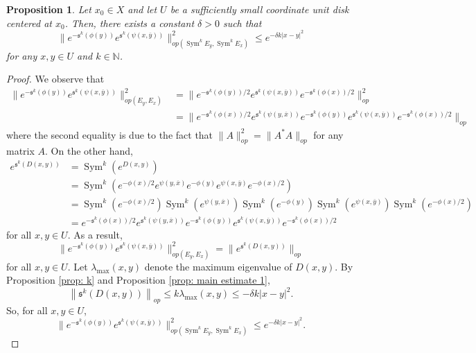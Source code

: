 \documentclass{amsart}
\newtheorem{prop}[thm]{Proposition}
\theoremstyle{definition}
\theoremstyle{remark}
\numberwithin{equation}{section}
\DeclareMathOperator{\Sym}{Sym}
\begin{document}
\begin{prop} \label{prop: main estimate 2}
Let $x_0 \in X$ and let $U$ be a sufficiently small coordinate unit disk centered at $x_0$. Then, there exists a constant $\delta > 0$ such that
$$
\|e^{-\mathfrak{s}^k( \phi(y))}e^{\mathfrak{s}^k(\psi(x,\overline{y}))}\|_{op(\Sym^kE_y,\Sym^kE_x)}^2 \leq e^{-\delta k|x-y|^2}
$$
for any $x,y \in U$ and $k \in \mathbb{N}$. 
\end{prop}
\begin{proof}

We observe that
\begin{align*}
\|e^{-\mathfrak{s}^k(\phi(y))}e^{\mathfrak{s}^k(\psi(x,\overline{y}))}\|_{op(E_y,E_x)}^2 & = \| e^{-\mathfrak{s}^k(\phi(y))/2} e^{\mathfrak{s}^k(\psi(x,\overline{y}))} e^{-\mathfrak{s}^k(\phi(x))/2}\|_{op}^2 \\
    & = \|e^{-\mathfrak{s}^k(\phi(x))/2} e^{\mathfrak{s}^k(\psi(y,\overline{x}))}e^{ - \mathfrak{s}^k(\phi(y))}  e^{\mathfrak{s}^k(\psi(x,\overline{y}))} e^{-\mathfrak{s}^k(\phi(x))/2}\|_{op} 
\end{align*}
where the second equality is due to the fact that $\|A\|_{op}^2 = \|A^*A\|_{op}$ for any matrix $A$. On the other hand,
\begin{equation*}
\begin{split}
e^{\mathfrak{s}^k \left ( D(x,y) \right )}
& = \Sym^k \left ( e^{D(x,y)} \right ) \\
& = \Sym^k \left ( e^{-\phi(x)/2} e^{\psi(y,\overline{x})}e^{-\phi(y)}  e^{\psi(x,\overline{y})} e^{-\phi(x)/2}\right )  \\
& = \Sym^k \left ( e^{-\phi(x)/2} \right ) \Sym^k \left ( e^{\psi(y,\overline{x})} \right ) \Sym^k \left ( e^{-\phi(y)} \right ) \Sym^k \left (  e^{\psi(x,\overline{y})} \right ) \Sym^k \left ( e^{-\phi(x)/2} \right )\\
& = e^{-\mathfrak{s}^k(\phi(x))/2} e^{\mathfrak{s}^k(\psi(y,\overline{x}))}e^{ - \mathfrak{s}^k(\phi(y))}  e^{\mathfrak{s}^k(\psi(x,\overline{y}))} e^{-\mathfrak{s}^k(\phi(x))/2}
\end{split}
\end{equation*}
for all $x,y \in U$.
As a result,
\begin{equation*}
\|e^{-\mathfrak{s}^k(\phi(y))}e^{\mathfrak{s}^k(\psi(x,\overline{y}))}\|_{op(E_y,E_x)}^2 = \|e^{\mathfrak{s}^k (D(x,y))}\|_{op}
\end{equation*}
for all $x,y \in U$. Let $\lambda_{\max}(x,y)$ denote the maximum eigenvalue of $D(x,y)$. By Proposition \ref{prop: k} and Proposition \ref{prop: main estimate 1}, 
$$
\left \| \mathfrak{s}^k(D(x,y))  \right \|_{op} \leq k \lambda_{\max}(x,y) \leq -\delta k |x-y|^2.
$$
So, for all $x,y \in U$,
$$
\|e^{- \mathfrak{s}^k(\phi(y))} e^{\mathfrak{s}^k(\psi(x,\overline{y}))}\|_{op(\Sym^k E_y, \Sym^k E_x)}^2 \leq e^{-\delta k |x-y|^2}.
$$

\end{proof}
\end{document}
